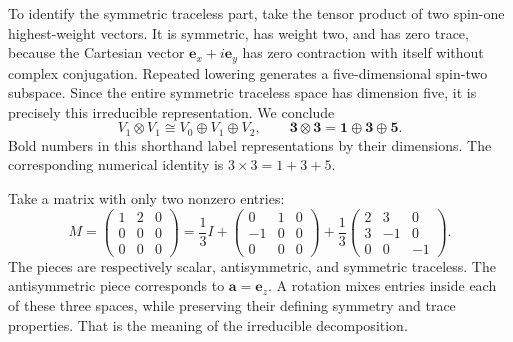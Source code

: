 \documentclass[11pt]{article}
\begin{document}
To identify the symmetric traceless part, take the tensor product of
two spin-one highest-weight vectors. It is symmetric, has weight two,
and has zero trace, because the Cartesian vector
\(\bm e_x+i\bm e_y\) has zero contraction with itself without complex
conjugation. Repeated lowering generates a five-dimensional spin-two
subspace. Since the entire symmetric traceless space has dimension five,
it is precisely this irreducible representation. We conclude
\begin{equation}
 \boxed{V_1\otimes V_1\cong V_0\oplus V_1\oplus V_2},
 \qquad \bm3\otimes\bm3=\bm1\oplus\bm3\oplus\bm5.
 \label{eq:three-times-three}
\end{equation}
Bold numbers in this shorthand label representations by their dimensions.
The corresponding numerical identity is \(3\times3=1+3+5\).

\begin{remarkbox}
Take a matrix with only two nonzero entries:
\[
 M=\begin{pmatrix}1&2&0\\0&0&0\\0&0&0\end{pmatrix}
 =\frac13 I+
 \begin{pmatrix}0&1&0\\-1&0&0\\0&0&0\end{pmatrix}
 +\frac13\begin{pmatrix}2&3&0\\3&-1&0\\0&0&-1\end{pmatrix}.
\]
The pieces are respectively scalar, antisymmetric, and symmetric
traceless. The antisymmetric piece corresponds to \(\bm a=\bm e_z\).
A rotation mixes entries inside each of these three spaces, while
preserving their defining symmetry and trace properties. That is the
meaning of the irreducible decomposition.
\end{remarkbox}
\end{document}
